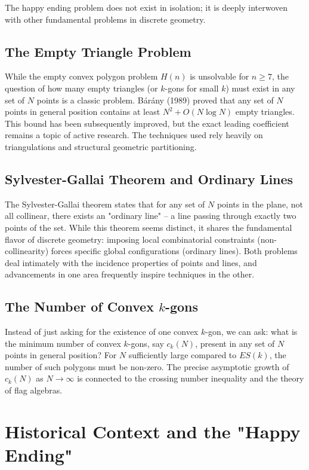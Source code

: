 \documentclass[11pt,a4paper]{article}
\begin{document}
The happy ending problem does not exist in isolation; it is deeply interwoven with other fundamental problems in discrete geometry.

\subsection{The Empty Triangle Problem}
While the empty convex polygon problem $H(n)$ is unsolvable for $n \ge 7$, the question of how many empty triangles (or $k$-gons for small $k$) must exist in any set of $N$ points is a classic problem.
B\'ar\'any (1989) proved that any set of $N$ points in general position contains at least $N^2 + O(N \log N)$ empty triangles. This bound has been subsequently improved, but the exact leading coefficient remains a topic of active research. The techniques used rely heavily on triangulations and structural geometric partitioning.

\subsection{Sylvester-Gallai Theorem and Ordinary Lines}
The Sylvester-Gallai theorem states that for any set of $N$ points in the plane, not all collinear, there exists an "ordinary line" -- a line passing through exactly two points of the set.
While this theorem seems distinct, it shares the fundamental flavor of discrete geometry: imposing local combinatorial constraints (non-collinearity) forces specific global configurations (ordinary lines). Both problems deal intimately with the incidence properties of points and lines, and advancements in one area frequently inspire techniques in the other.

\subsection{The Number of Convex $k$-gons}
Instead of just asking for the existence of one convex $k$-gon, we can ask: what is the minimum number of convex $k$-gons, say $c_k(N)$, present in any set of $N$ points in general position?
For $N$ sufficiently large compared to $ES(k)$, the number of such polygons must be non-zero. The precise asymptotic growth of $c_k(N)$ as $N \to \infty$ is connected to the crossing number inequality and the theory of flag algebras.

\section{Historical Context and the "Happy Ending"}
\end{document}
